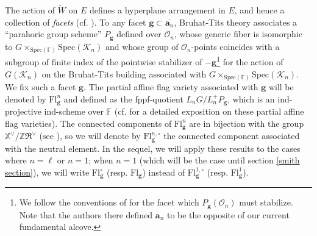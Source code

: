 \documentclass[11pt]{amsart}
\theoremstyle{plain}
\theoremstyle{remark}
\numberwithin{equation}{section}
\begin{document}
	The action of $\tilde{W}$ on $E$ defines a hyperplane arrangement in $E$, and hence a collection of \textit{facets} (cf. \cite[Ch.5, §1.2]{cdi_springer_books_10_1007_978_3_540_34491_9}). To any facet $\mathbf{g}\subset\overline{\mathbf{a}_n}$, Bruhat-Tits theory associates a ``parahoric group scheme'' $P_\mathbf{g}$ defined over $\mathcal{O}_n$, whose generic fiber is isomorphic to $G\times_{\mathrm{Spec}(\mathbb{F})} \mathrm{Spec}(\mathcal{K}_n)$ and whose group of $\mathcal{O}_n$-points coincides with a subgroup of finite index of the pointwise stabilizer of $-\mathbf{g}$\footnote{We follow the conventions of \cite[§4]{riche2020smithtreumann} for the facet which $P_\mathbf{g}(\mathcal{O}_n)$ must stabilize. Note that the authors there defined $\mathbf{a}_n$ to be the opposite of our current fundamental alcove.} for the action of $G(\mathcal{K}_n)$ on the Bruhat-Tits building associated with $G\times_{\mathrm{Spec}(\mathbb{F})} \mathrm{Spec}(\mathcal{K}_n)$. We fix such a facet $\mathbf{g}$. The partial affine flag variety associated with $\mathbf{g}$ will be denoted by $\mathrm{Fl}^{n}_{\mathbf{g}}$ and defined as the fppf-quotient $L_nG/L^+_nP_\mathbf{g}$, which is an ind-projective ind-scheme over $\mathbb{F}$ (cf. \cite{PAPPAS2008118} for a detailed exposition on these partial affine flag varieties). The connected components of $\mathrm{Fl}^{n}_{\mathbf{g}}$ are in bijection with the group $\mathbb{X}^\vee/\mathbb{Z}\mathfrak{R}^\vee$ (see  \cite[Theorem 0.1]{PAPPAS2008118}), so we will denote by $\mathrm{Fl}^{n,\circ}_{\mathbf{g}}$ the connected component associated with the neutral element. In the sequel, we will apply these results to the cases where $n=\ell$ or $n=1$; when $n=1$ (which will be the case until section \ref{smith section}), we will write $\mathrm{Fl}^{\circ}_{\mathbf{g}}$ (resp. $\mathrm{Fl}_{\mathbf{g}}$) instead of $\mathrm{Fl}^{1,\circ}_{\mathbf{g}}$ (resp. $\mathrm{Fl}^1_{\mathbf{g}}$).
\end{document}

